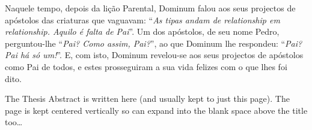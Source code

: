 \documentclass[11pt, twoside]{Thesis} %
\newcommand*{\defaultlinespacing}{\setstretch{1.5}}
\begin{document}
\frontmatter %

\defaultlinespacing %




\maketitle



{
	Naquele tempo, depois da lição Parental, Dominum falou aos seus projectos de apóstolos das criaturas que vaguavam: ``\emph{As tipas andam de relationship em relationship. Aquilo é falta de Pai}''. Um dos apóstolos, de seu nome Pedro, perguntou-lhe ``\emph{Pai? Como assim, Pai?}'', ao que Dominum lhe respondeu: ``\emph{Pai? Pai há só um!}''. E, com isto, Dominum revelou-se aos seus projectos de apóstolos como Pai de todos, e estes prosseguiram a sua vida felizes com o que lhes foi dito.~\cite{Rosa2017}
}







\abstract
{
	
	The Thesis Abstract is written here (and usually kept to just this page). The page is kept centered vertically so can expand into the blank space above the title too\ldots
	
	\lipsum[2]
}
\end{document}
